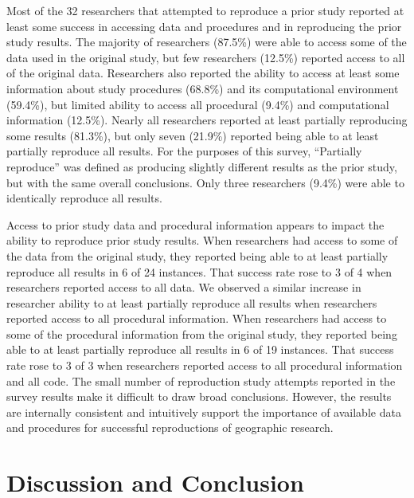\documentclass[]{interact}
\theoremstyle{plain}%
\theoremstyle{definition}
\theoremstyle{remark}
\begin{document}
Most of the 32 researchers that attempted to reproduce a prior study reported at least some success in accessing data and procedures and in reproducing the prior study results.   
The majority of researchers (87.5\%) were able to access some of the data used in the original study, but few researchers (12.5\%) reported access to all of the original data.
Researchers also reported the ability to access at least some information about study procedures (68.8\%) and its computational environment (59.4\%), but limited ability to access all procedural (9.4\%) and computational information (12.5\%). 
Nearly all researchers reported at least partially reproducing some results (81.3\%), but only seven (21.9\%) reported being able to at least partially reproduce all results.
For the purposes of this survey, ``Partially reproduce'' was defined as producing slightly different results as the prior study, but with the same overall conclusions.
Only three researchers (9.4\%) were able to identically reproduce all results.  

Access to prior study data and procedural information appears to impact the ability to reproduce prior study results. 
When researchers had access to some of the data from the original study, they reported being able to at least partially reproduce all results in 6 of 24 instances. 
That success rate rose to 3 of 4 when researchers reported access to all data. 
We observed a similar increase in researcher ability to at least partially reproduce all results when researchers reported access to all procedural information. 
When researchers had access to some of the procedural information from the original study, they reported being able to at least partially reproduce all results in 6 of 19 instances.
That success rate rose to 3 of 3 when researchers reported access to all procedural information and all code.
The small number of reproduction study attempts reported in the survey results make it difficult to draw broad conclusions.
However, the results are internally consistent and intuitively support the importance of available data and procedures for successful reproductions of geographic research.


\section*{Discussion and Conclusion}

\end{document}
